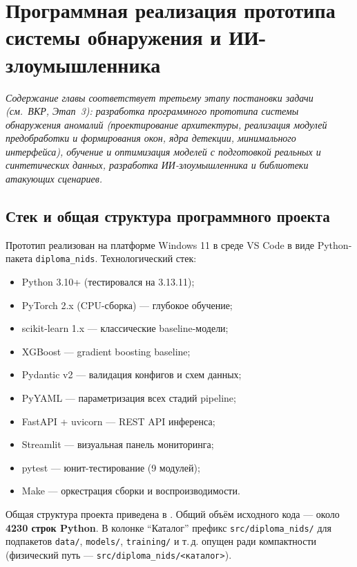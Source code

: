 \section{Программная реализация прототипа системы обнаружения и ИИ-злоумышленника}
\label{ch:impl}

\noindent
\textit{Содержание главы соответствует третьему этапу постановки
задачи (см.~ВКР, Этап~3): разработка программного прототипа системы
обнаружения аномалий (проектирование архитектуры, реализация модулей
предобработки и формирования окон, ядра детекции, минимального
интерфейса), обучение и оптимизация моделей с подготовкой реальных и
синтетических данных, разработка ИИ-злоумышленника и библиотеки
атакующих сценариев.}\\

\subsection{Стек и общая структура программного проекта}

Прототип реализован на платформе Windows 11 в среде VS Code в виде
Python-пакета \texttt{diploma\_nids}. Технологический стек:

\begin{itemize}
    \item Python 3.10+ (тестировался на 3.13.11);
    \item PyTorch 2.x (CPU-сборка) --- глубокое обучение;
    \item scikit-learn 1.x --- классические baseline-модели;
    \item XGBoost --- gradient boosting baseline;
    \item Pydantic v2 --- валидация конфигов и схем данных;
    \item PyYAML --- параметризация всех стадий pipeline;
    \item FastAPI + uvicorn --- REST API инференса;
    \item Streamlit --- визуальная панель мониторинга;
    \item pytest --- юнит-тестирование (9 модулей);
    \item Make --- оркестрация сборки и воспроизводимости.
\end{itemize}

Общая структура проекта приведена в .
Общий объём исходного кода --- около \textbf{4230 строк Python}.
В колонке ``Каталог'' префикс \texttt{src/diploma\_nids/} для подпакетов
\texttt{data/}, \texttt{models/}, \texttt{training/} и т.\,д. опущен ради
компактности (физический путь --- \texttt{src/diploma\_nids/<каталог>}).

